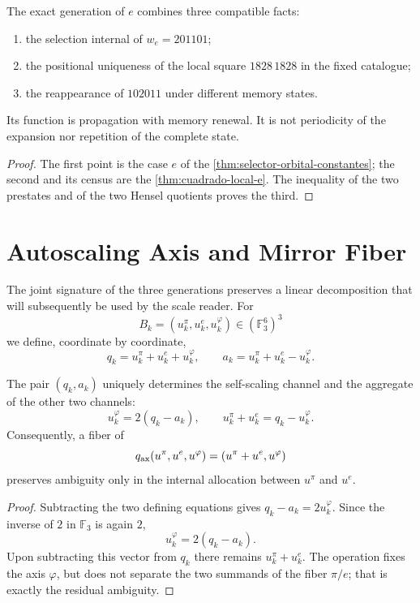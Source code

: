 \begin{proposition}
\label{prop:propagacion-e-rev6}
The exact generation of \(e\) combines three compatible facts:
\begin{enumerate}
\item the selection internal of \(w_e=201101\);
\item the positional uniqueness of the local square \(1828\,1828\) in the
fixed catalogue;
\item the reappearance of \(102011\) under different memory states.
\end{enumerate}
Its function is propagation with memory renewal. It is not periodicity of
the expansion nor repetition of the complete state.
\end{proposition}

\begin{proof}
The first point is the case \(e\) of the
\cref{thm:selector-orbital-constantes}; the second and its census are the
\cref{thm:cuadrado-local-e}. The inequality of the two prestates and of the
two Hensel quotients proves the third.
\end{proof}

\section{Autoscaling Axis and Mirror Fiber}

The joint signature of the three generations preserves a linear decomposition
that will subsequently be used by the scale reader. For
\[
 B_k=(u_k^\pi,u_k^e,u_k^\varphi)
 \in(\mathbb F_3^6)^3
\]
we define, coordinate by coordinate,
\[
 q_k=u_k^\pi+u_k^e+u_k^\varphi,
 \qquad
 a_k=u_k^\pi+u_k^e-u_k^\varphi.
\]

\begin{theorem}
\label{thm:eje-espejo-nonadico}
The pair \((q_k,a_k)\) uniquely determines the self-scaling channel and the
aggregate of the other two channels:
\[
 u_k^\varphi=2(q_k-a_k),
 \qquad
 u_k^\pi+u_k^e=q_k-u_k^\varphi.
\]
Consequently, a fiber of
\[
 q_{\rm ax}(u^\pi,u^e,u^\varphi)
 =(u^\pi+u^e,u^\varphi)
\]
preserves ambiguity only in the internal allocation between \(u^\pi\) and \(u^e\).
\end{theorem}

\begin{proof}
Subtracting the two defining equations gives
\(q_k-a_k=2u_k^\varphi\). Since the inverse of \(2\) in \(\mathbb F_3\) is
again \(2\),
\[
u_k^\varphi=2(q_k-a_k).
\]
Upon subtracting this vector from \(q_k\) there remains
\(u_k^\pi+u_k^e\). The operation fixes the axis \(\varphi\), but does not separate
the two summands of the fiber \(\pi/e\); that is exactly the residual
ambiguity.
\end{proof}

